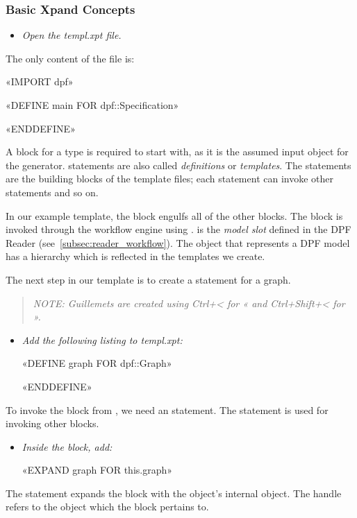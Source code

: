 \subsubsection{Basic Xpand Concepts}
\begin{itemize}
  \item \emph{Open the templ.xpt file.}
\end{itemize}
\flushleft The only content of the file is:
\begin{plainlisting}
«IMPORT dpf»

«DEFINE main FOR dpf::Specification»

«ENDDEFINE»
\end{plainlisting}{}
A  block for a  type is required to start with, as it is the assumed input object for the generator.  statements are also called \emph{definitions} or \emph{templates}. The  statements are the building blocks of the template files; each statement can invoke other  statements and so on. 

In our example template, the  block engulfs all of the other  blocks. The  block is invoked through the workflow engine using .  is the \emph{model slot} defined in the DPF Reader (see~\ref{subsec:reader_workflow}). The  object that represents a DPF model has a hierarchy which is reflected in the templates we create. 

The next step in our template is to create a  statement for a graph.
\begin{quote}
  \emph{NOTE: Guillemets are created using \emph{Ctrl+<} for « and \emph{Ctrl+Shift+<} for ».}
\end{quote}
\begin{itemize}
  \item \emph{Add the following listing to templ.xpt:}
  \begin{plainlisting}
«DEFINE graph FOR dpf::Graph»

«ENDDEFINE»
  \end{plainlisting}
\end{itemize}
To invoke the  block from , we need an  statement. The  statement is used for invoking other  blocks.
\begin{itemize}
  \item \emph{Inside the  block, add:}
  \begin{plainlisting}
«EXPAND graph FOR this.graph»
  \end{plainlisting}
\end{itemize}
The  statement expands the  block with the  object's internal  object. The  handle refers to the object which the  block pertains to. 

